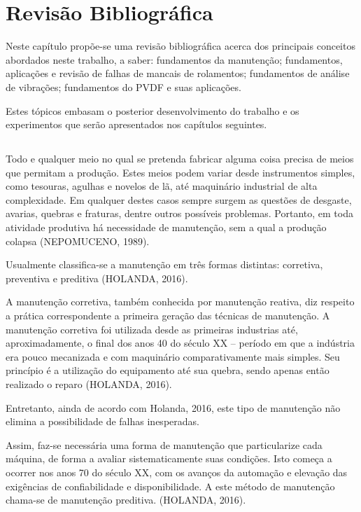 \documentclass[
	12pt,				
	oneside,			
	a4paper,			
	english,			
	brazil,			
	]{abntex2ppgsi}
\begin{document}
\chapter{Revisão Bibliográfica}

Neste capítulo propõe-se uma revisão bibliográfica acerca dos principais conceitos abordados neste trabalho, a saber: fundamentos da manutenção; fundamentos, aplicações e revisão de falhas de mancais de rolamentos; fundamentos de análise de vibrações; fundamentos do PVDF e suas aplicações. 

Estes tópicos embasam o posterior desenvolvimento do trabalho e os experimentos que serão apresentados nos capítulos seguintes.

\section{}
Todo e qualquer meio no qual se pretenda fabricar alguma coisa precisa de meios que permitam a produção. Estes meios podem variar desde instrumentos simples, como tesouras, agulhas e novelos de lã, até maquinário industrial de alta complexidade. Em qualquer destes casos sempre surgem as questões de desgaste, avarias, quebras e fraturas, dentre outros possíveis problemas. Portanto, em toda atividade produtiva  há necessidade de manutenção, sem a qual a produção colapsa (NEPOMUCENO, 1989).

	Usualmente classifica-se a manutenção em três formas distintas: corretiva, preventiva e preditiva (HOLANDA, 2016). 

	A manutenção corretiva, também conhecida por manutenção reativa, diz respeito a prática correspondente a primeira geração das técnicas de manutenção. A manutenção corretiva foi utilizada desde as primeiras industrias até, aproximadamente, o final dos anos 40 do século XX – período em que a indústria era pouco mecanizada e com maquinário comparativamente mais simples. Seu princípio é a utilização do equipamento até sua quebra, sendo apenas então realizado o reparo (HOLANDA, 2016). 
	
	Entretanto, ainda de acordo com Holanda, 2016, este tipo de manutenção não elimina a possibilidade de falhas inesperadas.

	Assim, faz-se necessária uma forma de manutenção que particularize cada máquina, de forma a avaliar sistematicamente suas condições. Isto começa a ocorrer nos anos 70 do século XX, com os avanços da automação e elevação das exigências de confiabilidade e disponibilidade. A este método de manutenção chama-se de manutenção preditiva. (HOLANDA, 2016).  
\end{document}
